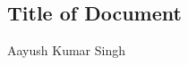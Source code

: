 \documentclass[12pt]{article}
\begin{document}

	\begin{center}
		\section*{Title of Document}
		Aayush Kumar Singh
	\end{center}
\end{document}
